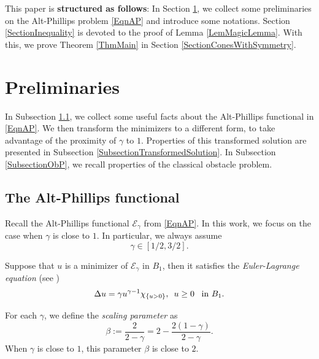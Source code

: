 \documentclass{amsart}
\def\PosS{\{u>0\}}
\def\EGa{\mathcal{E}_\gamma}
\def\hem{\hspace{0.5em}}
\def\vem{\vspace{0.6em}}
\theoremstyle{definition}
\numberwithin{equation}{section}
\theoremstyle{remark}
\begin{document}
\vem
This paper is \textbf{structured as follows}: In Section \ref{SectionPreliminaries}, we collect some preliminaries on the Alt-Phillips problem \eqref{EqnAP} and introduce some notations. Section \ref{SectionInequality} is devoted to the proof of Lemma \ref{LemMagicLemma}. With this, we prove Theorem \ref{ThmMain} in Section \ref{SectionConesWithSymmetry}.









\section{Preliminaries}
\label{SectionPreliminaries}

In Subsection \ref{SubsectionAP}, we collect some useful facts about the Alt-Phillips functional in \eqref{EqnAP}. We then transform the minimizers to a different form, to take advantage of the proximity of $\gamma$ to $1$. Properties of this transformed solution are presented in Subsection \ref{SubsectionTransformedSolution}. In Subsection \ref{SubsectionObP}, we recall properties of the classical obstacle problem.

\subsection{The Alt-Phillips functional}
\label{SubsectionAP}

Recall the Alt-Phillips functional $\mathcal{E}_\gamma$ from \eqref{EqnAP}. In this work, we focus on the case when  $\gamma$ is close to $1$. In particular, we always assume
\begin{equation*}
\gamma\in[1/2,3/2].
\end{equation*} 

Suppose that $u$ is a minimizer of $\EGa$ in $B_1$, then it satisfies the \textit{Euler-Lagrange equation} (see \cite{AP})
\begin{equation}
\label{EqnELEquation}
\Delta u=\gamma u^{\gamma-1}\chi_{\PosS}, \hem u\ge 0\hem \text{ in }B_1.
\end{equation} 


For each $\gamma$, we define the \textit{scaling parameter} as
\begin{equation}
\label{EqnBeta}
\beta:=\frac{2}{2-\gamma}=2-\frac{2(1-\gamma)}{2-\gamma}.
\end{equation} 
When $\gamma$ is close to $1$, this parameter $\beta$ is close to $2$. 
\end{document}
